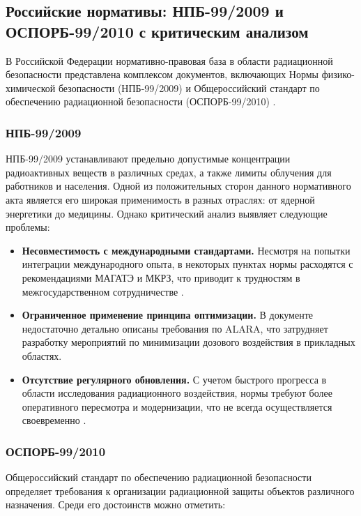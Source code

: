 \documentclass[a4paper, 14pt]{extarticle}
\begin{document}
\subsection{Российские нормативы: НПБ-99/2009 и ОСПОРБ-99/2010 с критическим анализом}

В Российской Федерации нормативно-правовая база в области радиационной безопасности представлена комплексом документов, включающих Нормы физико-химической безопасности (НПБ-99/2009) и Общероссийский стандарт по обеспечению радиационной безопасности (ОСПОРБ-99/2010) \cite{8}.

\subsubsection{НПБ-99/2009}

НПБ-99/2009 устанавливают предельно допустимые концентрации радиоактивных веществ в различных средах, а также лимиты облучения для работников и населения. Одной из положительных сторон данного нормативного акта является его широкая применимость в разных отраслях: от ядерной энергетики до медицины. Однако критический анализ выявляет следующие проблемы:

\begin{itemize}
    \item \textbf{Несовместимость с международными стандартами.} Несмотря на попытки интеграции международного опыта, в некоторых пунктах нормы расходятся с рекомендациями МАГАТЭ и МКРЗ, что приводит к трудностям в межгосударственном сотрудничестве \cite{9}.

    \item \textbf{Ограниченное применение принципа оптимизации.} В документе недостаточно детально описаны требования по ALARA, что затрудняет разработку мероприятий по минимизации дозового воздействия в прикладных областях.

    \item \textbf{Отсутствие регулярного обновления.} С учетом быстрого прогресса в области исследования радиационного воздействия, нормы требуют более оперативного пересмотра и модернизации, что не всегда осуществляется своевременно \cite{10}.
\end{itemize}

\subsubsection{ОСПОРБ-99/2010}

Общероссийский стандарт по обеспечению радиационной безопасности определяет требования к организации радиационной защиты объектов различного назначения. Среди его достоинств можно отметить:
\end{document}
